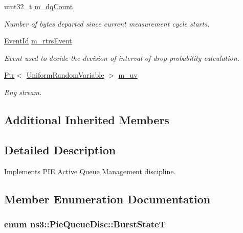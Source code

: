 \begin{DoxyCompactItemize}
uint32\+\_\+t \hyperlink{classns3_1_1PieQueueDisc_af0dc5330370bdc0013d694572fd08809}{m\+\_\+dq\+Count}
\begin{DoxyCompactList}\small\item\em Number of bytes departed since current measurement cycle starts. \end{DoxyCompactList}\item 
\hyperlink{classns3_1_1EventId}{Event\+Id} \hyperlink{classns3_1_1PieQueueDisc_a409e9d3bef27ea85fddd32048ea12f6f}{m\+\_\+rtrs\+Event}
\begin{DoxyCompactList}\small\item\em Event used to decide the decision of interval of drop probability calculation. \end{DoxyCompactList}\item 
\hyperlink{classns3_1_1Ptr}{Ptr}$<$ \hyperlink{classns3_1_1UniformRandomVariable}{Uniform\+Random\+Variable} $>$ \hyperlink{classns3_1_1PieQueueDisc_abcef525d0e61ee838769b2dc714f232a}{m\+\_\+uv}
\begin{DoxyCompactList}\small\item\em Rng stream. \end{DoxyCompactList}\end{DoxyCompactItemize}
\subsection*{Additional Inherited Members}


\subsection{Detailed Description}
Implements P\+IE Active \hyperlink{classns3_1_1Queue}{Queue} Management discipline. 

\subsection{Member Enumeration Documentation}
\subsubsection[{\texorpdfstring{Burst\+StateT}{BurstStateT}}]{\setlength{\rightskip}{0pt plus 5cm}enum {\bf ns3\+::\+Pie\+Queue\+Disc\+::\+Burst\+StateT}}\hypertarget{classns3_1_1PieQueueDisc_ad1530234d55d1552449983fd84b27d55}{}\label{classns3_1_1PieQueueDisc_ad1530234d55d1552449983fd84b27d55}


